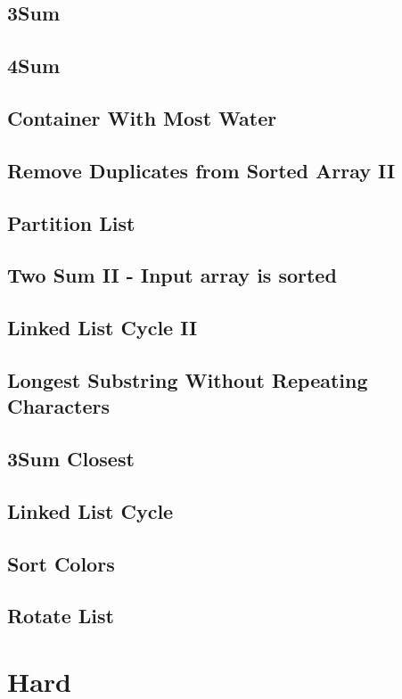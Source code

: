 \documentclass[11pt]{book}
\begin{document}
\subsection{3Sum}
\label{sec-15-2-1}
\subsection{4Sum}
\label{sec-15-2-2}
\subsection{Container With Most Water}
\label{sec-15-2-3}
\subsection{Remove Duplicates from Sorted Array II}
\label{sec-15-2-4}
\subsection{Partition List}
\label{sec-15-2-5}
\subsection{Two Sum II - Input array is sorted}
\label{sec-15-2-6}
\subsection{Linked List Cycle II}
\label{sec-15-2-7}
\subsection{Longest Substring Without Repeating Characters}
\label{sec-15-2-8}
\subsection{3Sum Closest}
\label{sec-15-2-9}
\subsection{Linked List Cycle}
\label{sec-15-2-10}
\subsection{Sort Colors}
\label{sec-15-2-11}
\subsection{Rotate List}
\label{sec-15-2-12}
\section{Hard}
\label{sec-15-3}
\end{document}
